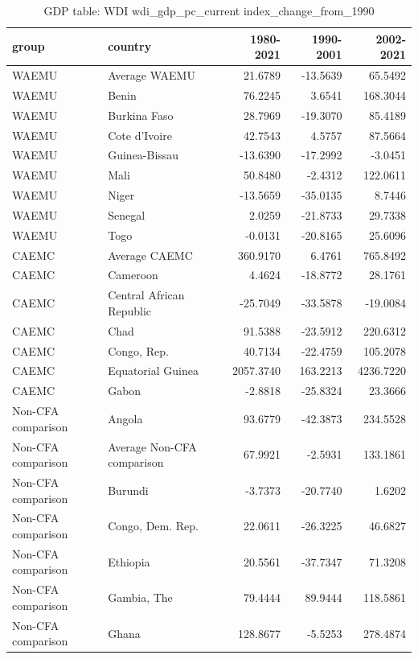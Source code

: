 \begin{table}

\caption{GDP table: WDI wdi_gdp_pc_current index_change_from_1990}
\centering
\begin{tabular}[t]{llrrr}
\toprule
group & country & 1980-2021 & 1990-2001 & 2002-2021\\
\midrule
WAEMU & Average WAEMU & 21.6789 & -13.5639 & 65.5492\\
WAEMU & Benin & 76.2245 & 3.6541 & 168.3044\\
WAEMU & Burkina Faso & 28.7969 & -19.3070 & 85.4189\\
WAEMU & Cote d'Ivoire & 42.7543 & 4.5757 & 87.5664\\
WAEMU & Guinea-Bissau & -13.6390 & -17.2992 & -3.0451\\
\addlinespace
WAEMU & Mali & 50.8480 & -2.4312 & 122.0611\\
WAEMU & Niger & -13.5659 & -35.0135 & 8.7446\\
WAEMU & Senegal & 2.0259 & -21.8733 & 29.7338\\
WAEMU & Togo & -0.0131 & -20.8165 & 25.6096\\
CAEMC & Average CAEMC & 360.9170 & 6.4761 & 765.8492\\
\addlinespace
CAEMC & Cameroon & 4.4624 & -18.8772 & 28.1761\\
CAEMC & Central African Republic & -25.7049 & -33.5878 & -19.0084\\
CAEMC & Chad & 91.5388 & -23.5912 & 220.6312\\
CAEMC & Congo, Rep. & 40.7134 & -22.4759 & 105.2078\\
CAEMC & Equatorial Guinea & 2057.3740 & 163.2213 & 4236.7220\\
\addlinespace
CAEMC & Gabon & -2.8818 & -25.8324 & 23.3666\\
Non-CFA comparison & Angola & 93.6779 & -42.3873 & 234.5528\\
Non-CFA comparison & Average Non-CFA comparison & 67.9921 & -2.5931 & 133.1861\\
Non-CFA comparison & Burundi & -3.7373 & -20.7740 & 1.6202\\
Non-CFA comparison & Congo, Dem. Rep. & 22.0611 & -26.3225 & 46.6827\\
\addlinespace
Non-CFA comparison & Ethiopia & 20.5561 & -37.7347 & 71.3208\\
Non-CFA comparison & Gambia, The & 79.4444 & 89.9444 & 118.5861\\
Non-CFA comparison & Ghana & 128.8677 & -5.5253 & 278.4874\\

\end{tabular}
\end{table}
